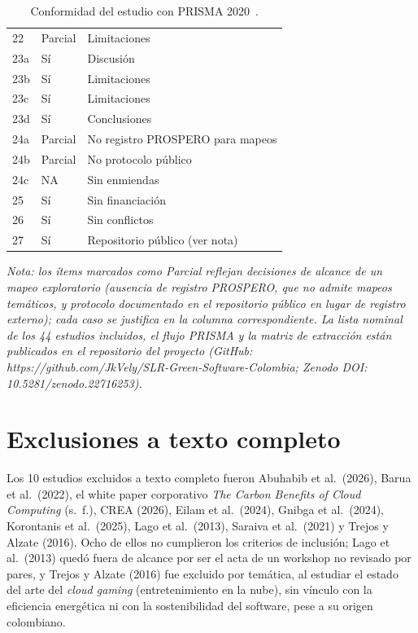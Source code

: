 \documentclass[conference]{IEEEtran}
\begin{document}
\begin{table}[htbp]
{\begin{tabular}{@{}R{1.5cm} R{2.0cm} R{6.0cm}@{}}
22 & Parcial & Limitaciones \\
23a & S\'i & Discusi\'on \\
23b & S\'i & Limitaciones \\
23c & S\'i & Limitaciones \\
23d & S\'i & Conclusiones \\
24a & Parcial & No registro PROSPERO para mapeos \\
24b & Parcial & No protocolo p\'ublico \\
24c & NA & Sin enmiendas \\
25 & S\'i & Sin financiaci\'on \\
26 & S\'i & Sin conflictos \\
27 & S\'i & Repositorio p\'ublico (ver nota) \\
\bottomrule
\end{tabular}%
}
\caption{Conformidad del estudio con PRISMA 2020~\cite{page2021,recesp2021}.}
\label{tab:prisma-check}
\par\vspace{2pt}
\scriptsize\textit{Nota: los \'items marcados como Parcial reflejan decisiones de alcance de un mapeo exploratorio (ausencia de registro PROSPERO, que no admite mapeos tem\'aticos, y protocolo documentado en el repositorio p\'ublico en lugar de registro externo); cada caso se justifica en la columna correspondiente. La lista nominal de los 44 estudios incluidos, el flujo PRISMA y la matriz de extracci\'on est\'an publicados en el repositorio del proyecto (GitHub: https://github.com/JkVely/SLR-Green-Software-Colombia; Zenodo DOI: 10.5281/zenodo.22716253).}
\end{table}

\section{Exclusiones a texto completo}\label{app:exclusiones}
Los 10 estudios excluidos a texto completo fueron Abuhabib et al.\ (2026), Barua et al.\ (2022), el white paper corporativo \emph{The Carbon Benefits of Cloud Computing} (s.~f.), CREA (2026), Eilam et al.\ (2024), Gnibga et al.\ (2024), Korontanis et al.\ (2025), Lago et al.\ (2013), Saraiva et al.\ (2021) y Trejos y Alzate (2016). Ocho de ellos no cumplieron los criterios de inclusi\'on; Lago et al.\ (2013) qued\'o fuera de alcance por ser el acta de un workshop no revisado por pares, y Trejos y Alzate (2016) fue excluido por tem\'atica, al estudiar el estado del arte del \emph{cloud gaming} (entretenimiento en la nube), sin v\'inculo con la eficiencia energ\'etica ni con la sostenibilidad del software, pese a su origen colombiano.
\end{document}
